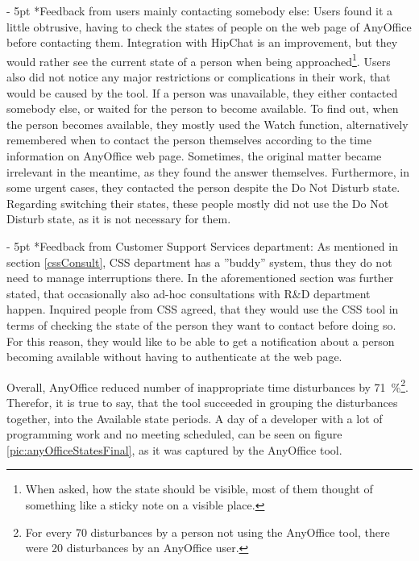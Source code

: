 \documentclass[11pt,singleside]{myfithesis2}
\makeatletter
\renewcommand\paragraph{
   \vspace{-10pt}
   \@startsection{paragraph}{4}{0mm}
      {\baselineskip}
      {- 5pt}
      {\normalfont\normalsize\bfseries}
}
\makeatother
\begin{document}
\paragraph*{Feedback from users mainly contacting somebody else: } Users found it a little obtrusive, having to check the states of people on the web page of AnyOffice before contacting them. Integration with HipChat is an improvement, but they would rather see the current state of a person when being approached\footnote{When asked, how the state should be visible, most of them thought of something like a sticky note on a visible place.}. Users also did not notice any major restrictions or complications in their work, that would be caused by the tool. If a person was unavailable, they either contacted somebody else, or waited for the person to become available. To find out, when the person becomes available, they mostly used the Watch function, alternatively remembered when to contact the person themselves according to the time information on AnyOffice web page. Sometimes, the original matter became irrelevant in the meantime, as they found the answer themselves. Furthermore, in some urgent cases, they contacted the person despite the Do Not Disturb state. Regarding switching their states, these people mostly did not use the Do Not Disturb state, as it is not necessary for them.

\paragraph*{Feedback from Customer Support Services department: } As mentioned in section \ref{cssConsult}, CSS department has a ''buddy'' system, thus they do not need to manage interruptions there. In the aforementioned section was further stated, that occasionally also ad-hoc consultations with R\&D department happen. Inquired people from CSS agreed, that they would use the CSS tool in terms of checking the state of the person they want to contact before doing so. For this reason, they would like to be able to get a notification about a person becoming available without having to authenticate at the web page.

Overall, AnyOffice reduced number of inappropriate time disturbances by 71~\%\footnote{For every 70 disturbances by a person not using the AnyOffice tool, there were 20 disturbances by an AnyOffice user.}. Therefor, it is true to say, that the tool succeeded in grouping the disturbances together, into the Available state periods. A day of a developer with a lot of programming work and no meeting scheduled, can be seen on figure \ref{pic:anyOfficeStatesFinal}, as it was captured by the AnyOffice tool.
\end{document}
